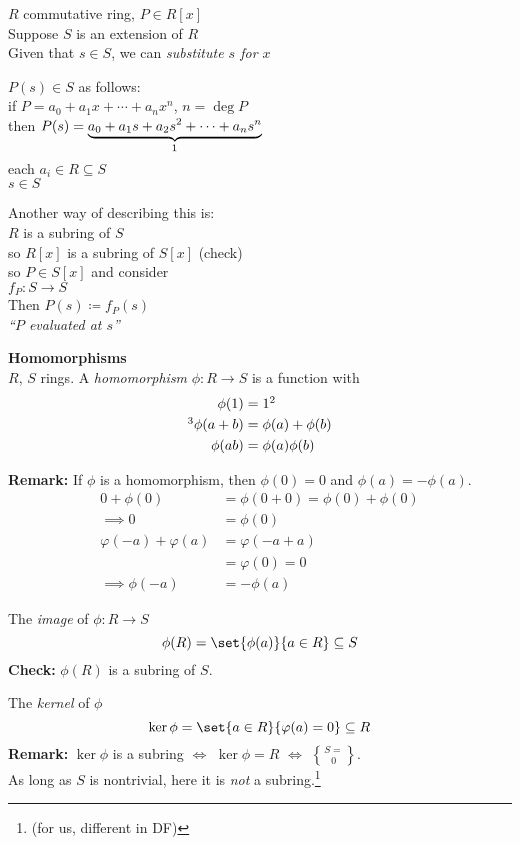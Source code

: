  $R$ commutative ring, $P\in R[x]$ \\
Suppose $S$ is an extension of $R$ \\
Given that $s\in S$, we can \emph{substitute $s$ for $x$}

$P(s)\in S$ as follows: \\
if $P=a_0+a_1x+\dotsb+a_nx^n$, $n=\deg P$ \\
then $P(s)=\underbrace{a_0+a_1s+a_2s^2+\dotsb+a_ns^n}_{\footnotemark}$ \\
each $a_i\in R\subseteq S$ \\
$s\in S$

Another way of describing this is: \\
$R$ is a subring of $S$ \\
so $R[x]$ is a subring of $S[x]$ (check) \\
so $P\in S[x]$ and consider \\
$f_P\colon S\to S$ \\
Then $P(s)\coloneqq f_P(s)$ \\
\emph{``$P$ evaluated at $s$''}

\textbf{Homomorphisms} \\
 $R$, $S$ rings.  A \emph{homomorphism} $\phi\colon R\to S$ is a function with
\begin{align*}
\phi(1) &= 1\footnotemark \\
\footnotemark\phi(a+b) &= \phi(a) + \phi(b) \\
\phi(ab) &= \phi(a)\phi(b)
\end{align*}\addtocounter{footnote}{-1}\addtocounter{footnote}{1}
\textbf{Remark:} If $\phi$ is a homomorphism, then $\phi(0)=0$ and $\phi(a)=-\phi(a)$. \\
\pf \begin{align*}
0 + \phi(0) &= \phi(0+0) = \phi(0) + \phi(0) \\
\implies 0 &= \phi(0) \\
\varphi(-a) + \varphi(a) &= \varphi(-a+a) \\
&= \varphi(0) = 0 \\
\implies \phi(-a) &= -\phi(a)
\end{align*}

The \emph{image} of $\phi\colon R\to S$
\[ \phi(R) = \set{\phi(a)}{a\in R} \subseteq S \]
\textbf{Check:} $\phi(R)$ is a subring of $S$.

The \emph{kernel} of $\phi$
\[ \ker\phi = \set{a\in R}{\varphi(a)=0} \subseteq R \]
\textbf{Remark:} $\ker\phi$ is a subring $\iff$ $\ker\phi=R$ $\iff$ $S=\brace0$. \\
As long as $S$ is nontrivial, here it is \emph{not} a subring.\footnote{(for us, different in DF)}

